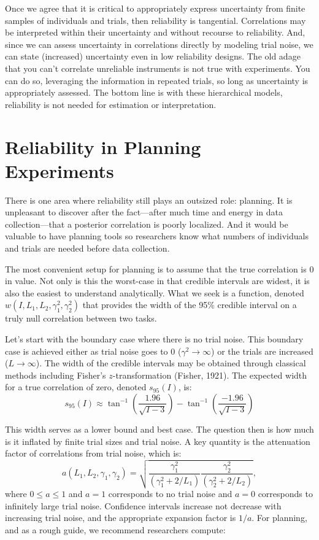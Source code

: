 \documentclass[
  ,man]{apa6}
\begin{document}
Once we agree that it is critical to appropriately express uncertainty from finite samples of individuals and trials, then reliability is tangential. Correlations may be interpreted within their uncertainty and without recourse to reliability. And, since we can assess uncertainty in correlations directly by modeling trial noise, we can state (increased) uncertainty even in low reliability designs. The old adage that you can't correlate unreliable instruments is not true with experiments. You can do so, leveraging the information in repeated trials, so long as uncertainty is appropriately assessed. The bottom line is with these hierarchical models, reliability is not needed for estimation or interpretation.

\section{Reliability in Planning Experiments}\label{reliability-in-planning-experiments}

There is one area where reliability still plays an outsized role: planning.
It is unpleasant to discover after the fact---after much time and energy in data collection---that a posterior correlation is poorly localized. And it would be valuable to have planning tools so researchers know what numbers of individuals and trials are needed before data collection.

The most convenient setup for planning is to assume that the true correlation is 0 in value. Not only is this the worst-case in that credible intervals are widest, it is also the easiest to understand analytically. What we seek is a function, denoted \(w(I,L_1,L_2,\gamma^2_1,\gamma^2_2)\) that provides the width of the 95\% credible interval on a truly null correlation between two tasks.

Let's start with the boundary case where there is no trial noise. This boundary case is achieved either as trial noise goes to 0 (\(\gamma^2 \rightarrow \infty\)) or the trials are increased (\(L\rightarrow \infty\)).
The width of the credible intervals may be obtained through classical methods including Fisher's \(z\)-transformation (Fisher, 1921). The expected width for a true correlation of zero, denoted \(s_{95}(I)\), is:
\[
s_{95}(I) \approx \tan^{-1}\left(\frac{1.96}{\sqrt{I-3}}\right)-\tan^{-1}\left(\frac{-1.96}{\sqrt{I-3}}\right)
\]

This width serves as a lower bound and best case. The question then is how much is it inflated by finite trial sizes and trial noise. A key quantity is the attenuation factor of correlations from trial noise, which is:
\[
a(L_1,L_2,\gamma_1,\gamma_2)=\sqrt{\frac{\gamma_1^2}{(\gamma_1^2+2/L_1)}\frac{\gamma_2^2}{(\gamma_2^2+2/L_2)}},
\]
where \(0 \leq a \leq 1\) and \(a=1\) corresponds to no trial noise and \(a=0\) corresponds to infinitely large trial noise. Confidence intervals increase not decrease with increasing trial noise, and the appropriate expansion factor is \(1/a\). For planning, and as a rough guide, we recommend researchers compute:
\end{document}

